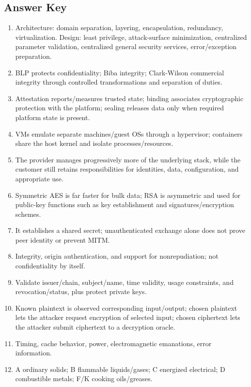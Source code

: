 \documentclass[10pt,letterpaper]{article}
\begin{document}
\subsection*{\color{teal}Answer Key}
\begin{enumerate}
\item Architecture: domain separation, layering, encapsulation, redundancy, virtualization. Design: least privilege, attack-surface minimization, centralized parameter validation, centralized general security services, error/exception preparation.
\item BLP protects confidentiality; Biba integrity; Clark-Wilson commercial integrity through controlled transformations and separation of duties.
\item Attestation reports/measures trusted state; binding associates cryptographic protection with the platform; sealing releases data only when required platform state is present.
\item VMs emulate separate machines/guest OSs through a hypervisor; containers share the host kernel and isolate processes/resources.
\item The provider manages progressively more of the underlying stack, while the customer still retains responsibilities for identities, data, configuration, and appropriate use.
\item Symmetric AES is far faster for bulk data; RSA is asymmetric and used for public-key functions such as key establishment and signatures/encryption schemes.
\item It establishes a shared secret; unauthenticated exchange alone does not prove peer identity or prevent MITM.
\item Integrity, origin authentication, and support for nonrepudiation; not confidentiality by itself.
\item Validate issuer/chain, subject/name, time validity, usage constraints, and revocation/status, plus protect private keys.
\item Known plaintext is observed corresponding input/output; chosen plaintext lets the attacker request encryption of selected input; chosen ciphertext lets the attacker submit ciphertext to a decryption oracle.
\item Timing, cache behavior, power, electromagnetic emanations, error information.
\item A ordinary solids; B flammable liquids/gases; C energized electrical; D combustible metals; F/K cooking oils/greases.
\end{enumerate}
\end{document}
